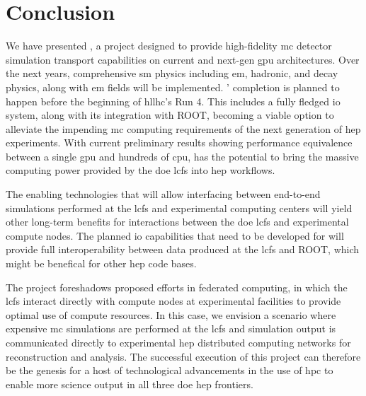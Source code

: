 \section{Conclusion}

We have presented \celeritas, a project designed to provide high-fidelity
\ac{mc} detector simulation transport capabilities on current and next-gen
\ac{gpu} architectures. Over the next years, comprehensive \ac{sm} physics
including \ac{em}, hadronic, and decay physics, along with \ac{em} fields will
be implemented. \celeritas' completion is planned to happen before the beginning
of \acs{hllhc}'s Run 4. This includes a fully fledged \ac{io} system, along with
its integration with ROOT, becoming a viable option to alleviate the impending
\ac{mc} computing requirements of the next generation of \ac{hep} experiments.
With current preliminary results showing performance equivalence between a
single \ac{gpu} and hundreds of \acs{cpu}, \celeritas has the potential to
bring the massive computing power provided by the \ac{doe} \acp{lcf} into
\ac{hep} workflows.

The enabling technologies that will allow interfacing between end-to-end
simulations performed at the \acp{lcf} and experimental computing centers will
yield other long-term benefits for interactions between the \ac{doe} \acp{lcf}
and experimental compute nodes. The planned \ac{io} capabilities that need to be
developed for \celeritas will provide full interoperability between data
produced at the \acp{lcf} and ROOT, which might be benefical for other \ac{hep}
code bases.

The \celeritas project foreshadows proposed efforts in federated computing, in
which the \acp{lcf} interact directly with compute nodes at experimental
facilities to provide optimal use of compute resources.  In this case, we
envision a scenario where expensive \ac{mc} simulations are performed at the
\acp{lcf} and simulation output is communicated directly to experimental
\ac{hep} distributed computing networks for reconstruction and analysis.  The
successful execution of this project can therefore be the genesis for a host of
technological advancements in the use of \ac{hpc} to enable more science output
in all three \ac{doe} \ac{hep} frontiers.
